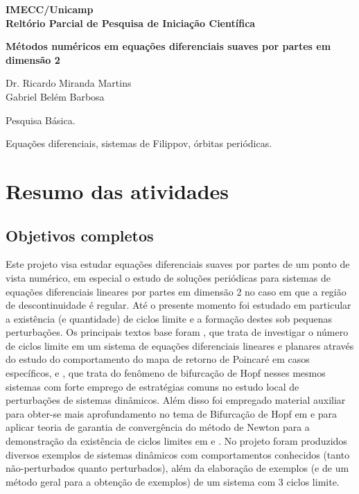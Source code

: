 \documentclass[12pt]{article}
\begin{document}
\fontsize{14}{18} \selectfont 


\begin{center}
{\bf IMECC/Unicamp}\\
{\bf Reltório Parcial de Pesquisa de Iniciação Científica}\\

\vspace{.5cm}

{\bf\Large Métodos numéricos em equações diferenciais suaves por partes em dimensão 2}
\end{center}

\vspace{1cm}

 Dr. Ricardo Miranda Martins\\
  Gabriel Belém Barbosa\\

\medskip
 
 Pesquisa Básica.

 Equações diferenciais, sistemas de Filippov, órbitas periódicas.


\section*{Resumo das atividades}
\subsection*{Objetivos completos}
Este projeto visa estudar equações diferenciais suaves por partes de um ponto de vista numérico, em especial o estudo de soluções periódicas para sistemas de equações diferenciais lineares por partes em dimensão 2 no caso em que a região de
descontinuidade é regular. Até o presente momento foi estudado em particular a existência (e quantidade) de ciclos limite e a formação destes sob pequenas perturbações. Os principais textos base foram \cite{Huan:etal:2012}, que trata de investigar o número de ciclos limite em um sistema de equações diferenciais lineares e planares através do estudo do comportamento do mapa de retorno de Poincaré em casos específicos, e \cite{HAN20102399}, que trata do fenômeno de bifurcação de Hopf nesses mesmos sistemas com forte emprego de estratégias comuns no estudo local de perturbações de sistemas dinâmicos. Além disso foi empregado material auxiliar para obter-se mais aprofundamento no tema de Bifurcação de Hopf em \cite{Kuznetsov:1998} e para aplicar teoria de garantia de convergência do método de Newton para a demonstração da existência de ciclos limites em \cite{LilPonce2012} e \cite{Tapia1971}. No projeto foram produzidos diversos exemplos de sistemas dinâmicos com comportamentos conhecidos (tanto não-perturbados quanto  perturbados), além da elaboração de exemplos (e de um método geral para a obtenção de exemplos) de um sistema com 3 ciclos limite.
\end{document}
